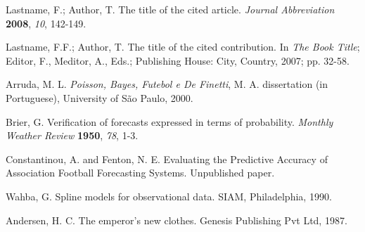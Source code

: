 \documentclass[journal,article,accept,moreauthors,pdftex,12pt,a4paper]{mdpi}
\begin{document}
\begin{thebibliography}{999} %

Lastname, F.; Author, T. The title of the cited article. {\em Journal Abbreviation} {\bf 2008}, {\em 10}, 142-149.

Lastname, F.F.; Author, T. The title of the cited contribution. In {\em The Book Title}; Editor, F., Meditor, A., Eds.; Publishing House: City, Country, 2007; pp. 32-58.


Arruda, M. L. {\em Poisson, Bayes, Futebol e De Finetti}, M. A. dissertation (in Portuguese), University of S\~ao Paulo, 2000.

Brier, G. Verification of forecasts expressed in terms of probability. {\em Monthly Weather Review} {\bf 1950}, {\em 78}, 1-3.

Constantinou, A. and Fenton, N. E. Evaluating the Predictive Accuracy of Association Football Forecasting Systems. Unpublished paper.

Wahba, G. Spline models for observational data.
SIAM, Philadelphia, 1990.

Andersen, H.  C. The emperor's new clothes. Genesis Publishing Pvt Ltd, 1987.

\end{thebibliography}

%
%


%


%
\end{document}
